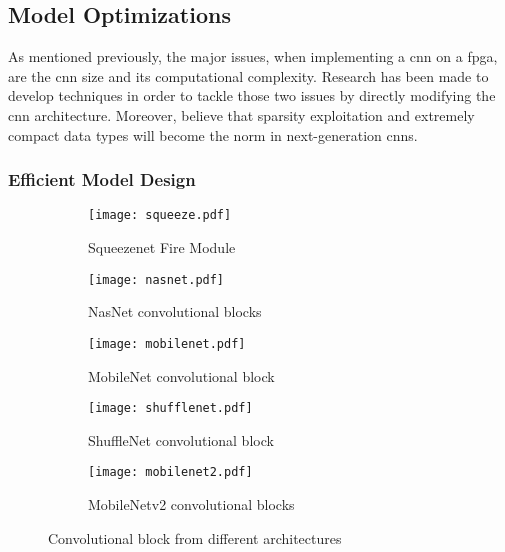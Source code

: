 \subsection{Model Optimizations} \label{subsec:mdopti}
As mentioned previously, the major issues, when implementing a \acrshort{cnn} on a \acrshort{fpga}, are the \acrshort{cnn} size and its computational complexity. Research has been made to develop techniques in order to tackle those two issues by directly modifying the \acrshort{cnn} architecture. Moreover, \textcite{nurvitadhi_can_2017} believe that sparsity exploitation and extremely compact data types will become the norm in next-generation \acrshort{cnn}s.
%
%
\subsubsection{Efficient Model Design}
%
\begin{figure}
    \centering
    \begin{subfigure}{0.49\linewidth}
        \centering
        \texttt{[image: squeeze.pdf]}
        \caption{Squeezenet Fire Module\cite{iandola_squeezenet_2016}}
        \label{fig:archi_building_block:sqn}
    \end{subfigure}
    \begin{subfigure}{0.49\linewidth}
        \centering
        \texttt{[image: nasnet.pdf]}
        \caption{NasNet convolutional blocks \cite{zoph_learning_2018}}
        \label{fig:archi_building_block:nasn}
    \end{subfigure}
    \begin{subfigure}{0.49\linewidth}
        \centering
        \texttt{[image: mobilenet.pdf]}
        \caption{MobileNet convolutional block \cite{howard_mobilenets_2017}}
        \label{fig:archi_building_block:mbn}
    \end{subfigure}
    \begin{subfigure}{0.49\linewidth}
        \centering
        \texttt{[image: shufflenet.pdf]}
        \caption{ShuffleNet convolutional block \cite{zhang_shufflenet_2018}}
        \label{fig:archi_building_block:shn}
    \end{subfigure}
    \begin{subfigure}{0.49\linewidth}
        \centering
        \texttt{[image: mobilenet2.pdf]}
        \caption{MobileNetv2 convolutional blocks \cite{sandler_mobilenetv2_2018}}
        \label{fig:archi_building_block:mb2n}
    \end{subfigure}
    \caption{Convolutional block from different architectures}
    \label{fig:archi_building_block}
\end{figure}
